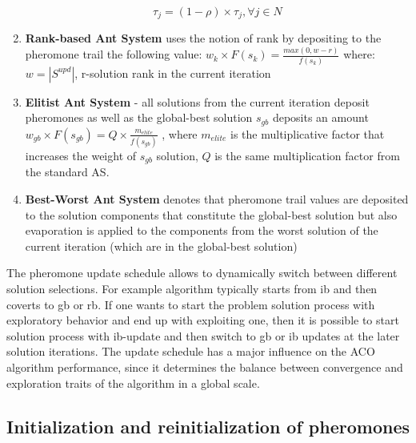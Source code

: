 \begin{enumerate}
\begin{equation}
\tau_j = (1-\rho) \times \tau_j, \forall j \in N
\label{eq:mmas_evaporation}
\end{equation}

\item {\textbf{Rank-based Ant System} uses the notion of rank by depositing \cite{ras} to the pheromone trail the following value:
$w_k \times F(s_k) = \frac{max(0,w-r)}{f(s_k)}$
where: $w=|S^{upd}|$, r-solution rank in the current iteration
}

\item {\textbf{Elitist Ant System} - all solutions from the current iteration deposit pheromones as well as the global-best solution $s_{gb}$ deposits an amount $w_{gb} \times F(s_{gb}) = Q \times \frac{m_{elite}}{f(s_{gb})}$ \cite{eas}, where $m_{elite}$ is the multiplicative factor that increases the weight of $s_{gb}$ solution, $Q$ is the same multiplication factor from the standard AS.}

\item {\textbf{Best-Worst Ant System} denotes that pheromone trail values are deposited to the solution components that constitute the global-best solution but also evaporation is applied to the components from the worst solution of the current iteration (which are in the global-best solution) \cite{bwas}}

\end{enumerate}

The pheromone update schedule allows to dynamically switch between different solution selections. For example algorithm typically starts from ib and then coverts to gb or rb. If one wants to start the problem solution process with exploratory behavior and end up with exploiting one, then it is possible to start solution process with ib-update and then switch to gb or ib updates at the later solution iterations. The update schedule has a major influence on the ACO algorithm performance, since it determines the balance between convergence and exploration traits of the algorithm in a global scale.



\subsection{Initialization and reinitialization of pheromones}

